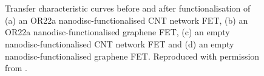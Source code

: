 \documentclass[
  a4paper,
]{scrbook}
\begin{document}
\begin{figure}
\begin{minipage}[t]{0.03\linewidth}
{\centering 


}

\end{minipage}%
%
\begin{minipage}[t]{0.01\linewidth}

{\centering 

~

}

\end{minipage}%
%
\begin{minipage}[t]{0.45\linewidth}

{\centering 


}

\end{minipage}%
%
\begin{minipage}[t]{0.01\linewidth}

{\centering 

~

}

\end{minipage}%

\caption{\label{fig-functionalisation-literature}Transfer characteristic
curves before and after functionalisation of (a) an OR22a
nanodisc-functionalised CNT network FET, (b) an OR22a
nanodisc-functionalised graphene FET, (c) an empty
nanodisc-functionalised CNT network FET and (d) an empty
nanodisc-functionalised graphene FET. Reproduced with permission from
\autocite{Murugathas2019a,Murugathas2020}.}

\end{figure}
\end{document}
